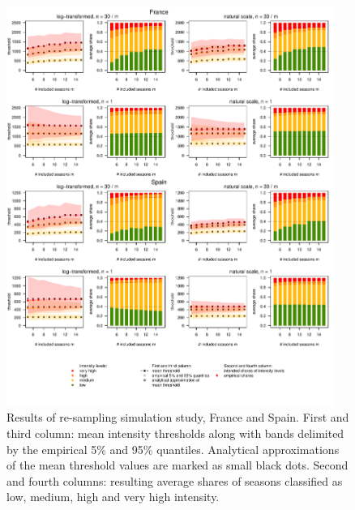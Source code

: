 \documentclass{article}
\begin{document}
\begin{figure}
\centering
\includegraphics[page=1, width=0.95\textwidth]{figure/plot_results.pdf}
\caption{Results of re-sampling simulation study, France and Spain. First and third column: mean intensity thresholds along with bands delimited by the empirical 5\% and 95\% quantiles. Analytical approximations of the mean threshold values are marked as small black dots. Second and fourth columns: resulting average shares of seasons classified as low, medium, high and very high intensity.}
\label{fig:results1}
\end{figure}
\end{document}
